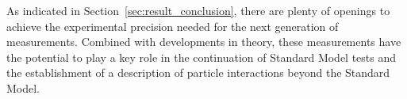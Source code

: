 As indicated in Section~\ref{sec:result_conclusion}, there are plenty of openings to achieve the experimental precision needed for the next
generation of \BstoJpsiKK{} measurements. Combined with developments in theory, these measurements have the potential to play a key role in
the continuation of Standard Model tests and the establishment of a description of particle interactions beyond the Standard Model.
